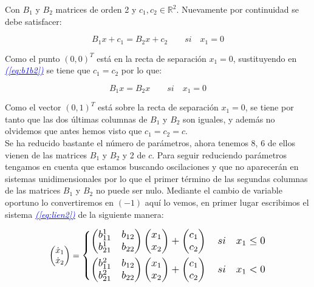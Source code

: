 \documentclass[12pt,a4paper]{report} %
\newcommand{\eref}[1]{\hyperref[#1]{\textcolor{blue}{\textit{(\ref*{#1})}}}}
\begin{document}
	Con $B_1$ y $B_2$ matrices de orden 2 y $c_1, c_2 \in \mathbb{R}^2$. Nuevamente por continuidad se debe satisfacer:
	
	\begin{equation}
		\label{eq:b1b2}
		B_1x+c_1=B_2x+c_2 \qquad si \quad x_1=0
	\end{equation}\smallskip
	
	Como el punto $(0,0)^T$ está en la recta de separación $x_1=0$, sustituyendo en \eref{eq:b1b2} se tiene que $c_1=c_2$ por lo que:
	
	\begin{equation}
		B_1x=B_2x \qquad si \quad x_1=0
	\end{equation}\smallskip
	
	Como el vector $(0,1)^T$ está sobre la recta de separación $x_1=0$, se tiene por tanto que las dos últimas columnas de $B_1$ y $B_2$ son iguales, y además no olvidemos que  antes hemos visto que $c_1=c_2=c$.
	\\ [0.5cm]
	Se ha reducido bastante el número de parámetros, ahora tenemos 8, 6 de ellos vienen de las matrices $B_1$ y $B_2$ y 2 de $c$. Para seguir reduciendo parámetros tengamos en cuenta que estamos buscando oscilaciones y que no aparecerán en sistemas unidimensionales por lo que el primer término de las segundas columnas de las matrices $B_1$ y $B_2$ no puede ser nulo. Mediante el cambio de variable oportuno lo convertiremos en $(-1)$ aquí lo vemos, en primer lugar escribimos el sistema \eref{eq:lien2} de la siguiente manera:
	
	\begin{equation}
		\begin{pmatrix*}[r]
			\dot{x}_1 \\ \dot{x}_2
		\end{pmatrix*}=
		\label{eq:lie-1}
		\scalebox{1.2}{$\displaystyle
			\left\{
			\begin{aligned}
				\begin{pmatrix*}[r]
					b_{11}^1 & b_{12} \\
					b_{21}^1 & b_{22}
				\end{pmatrix*}\begin{pmatrix*}[r]
				x_1\\x_2
				\end{pmatrix*}+\begin{pmatrix*}[r]
				c_1 \\ c_2
				\end{pmatrix*} \quad si \quad x_1 \leq 0 \\
				\begin{pmatrix*}[r]
					b_{11}^2 & b_{12} \\
					b_{21}^2 & b_{22}
				\end{pmatrix*}\begin{pmatrix*}[r]
				x_1\\x_2
				\end{pmatrix*}+\begin{pmatrix*}[r]
					c_1 \\ c_2
				\end{pmatrix*} \quad si \quad x_1 < 0
			\end{aligned}
			\right.
			$}
	\end{equation}\smallskip
	
\end{document}
